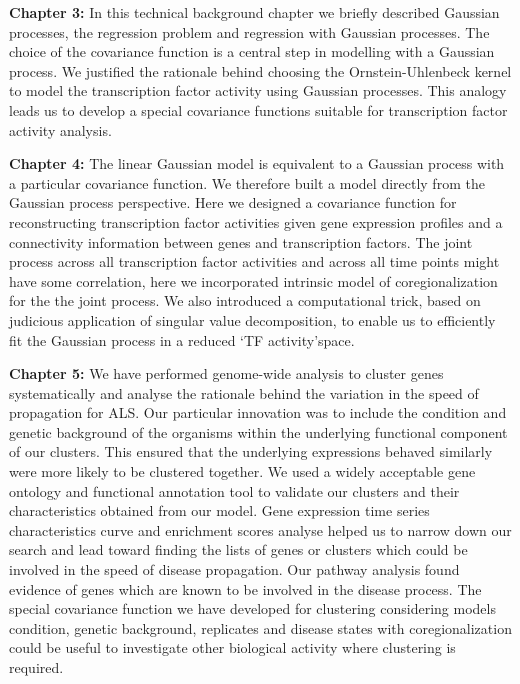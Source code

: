 \textbf{Chapter 3:} In this technical background chapter we briefly described Gaussian processes, the regression problem and regression with Gaussian processes. The choice of the covariance function is a central step in modelling with a Gaussian process. We justified the rationale behind choosing the Ornstein-Uhlenbeck kernel to model the transcription factor activity using Gaussian processes. This analogy leads us to develop a special covariance functions suitable for transcription factor activity analysis. 

\textbf{Chapter 4:} The linear Gaussian model is equivalent to a Gaussian process with a particular covariance function. We therefore built a model directly from the Gaussian process perspective. Here we designed a covariance function for reconstructing transcription factor activities given gene expression profiles and a connectivity information between genes and transcription factors. The joint process across all transcription factor activities and across all time points might have some correlation, here we incorporated intrinsic model of coregionalization for the the joint process. We also introduced a computational trick, based on  judicious application of singular value decomposition, to enable us to efficiently fit the Gaussian process in a reduced \lq TF activity\rq space. 

\textbf{Chapter 5:} We have performed genome-wide analysis to cluster genes systematically and analyse the rationale behind the variation in the speed of propagation for ALS. Our particular innovation was to include the condition and genetic background of the organisms within the underlying functional component of our clusters. This ensured that the underlying expressions behaved similarly were more likely to be clustered together. We used a widely acceptable gene ontology and functional annotation tool to validate our clusters and their characteristics obtained from our model. Gene expression time series characteristics curve and enrichment scores analyse helped us to narrow down our search and lead toward finding the lists of genes or clusters which could be involved in the speed of disease propagation. Our pathway analysis found evidence of genes which are known to be involved in the disease process. The special covariance function we have developed for clustering considering models condition, genetic background, replicates and disease states with coregionalization could be useful to investigate other biological activity where clustering is required. 

